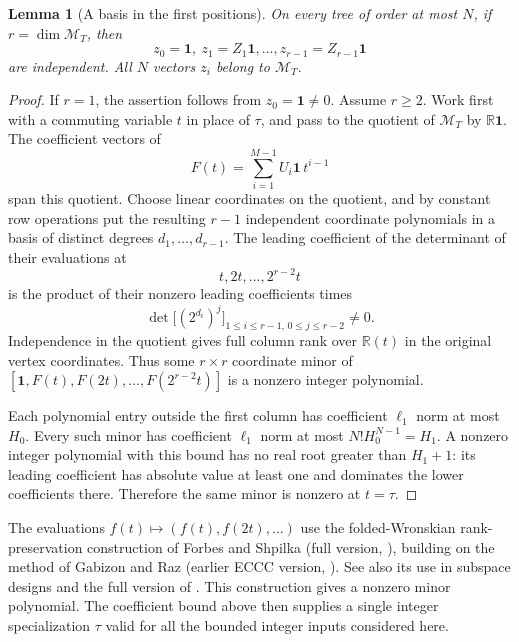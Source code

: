 \documentclass[11pt,letterpaper]{article}
\newtheorem{lemma}[theorem]{Lemma}
\theoremstyle{definition}\newtheorem{definition}[theorem]{Definition}
\theoremstyle{remark}\newtheorem{remark}[theorem]{Remark}
\newcommand{\R}{\mathbb R}\newcommand{\Q}{\mathbb Q}\newcommand{\Z}{\mathbb Z}
\newcommand{\one}{\mathbf1}\newcommand{\M}{\mathcal M}
\begin{document}
\begin{lemma}[A basis in the first positions]\label{lem:prefix}
On every tree of order at most $N$, if $r=\dim\M_T$, then
\[
z_0=\one,\ z_1=Z_1\one,\ldots,z_{r-1}=Z_{r-1}\one
\]
are independent. All $N$ vectors $z_i$ belong to $\M_T$.
\end{lemma}
\begin{proof}
If $r=1$, the assertion follows from $z_0=\one\ne0$. Assume $r\ge2$. Work first with a commuting variable $t$ in place of $\tau$, and pass to the quotient of $\M_T$ by $\R\one$. The coefficient vectors of
\[
F(t)=\sum_{i=1}^{M-1}U_i\one\,t^{i-1}
\]
span this quotient. Choose linear coordinates on the quotient, and by constant row operations put the resulting $r-1$ independent coordinate polynomials in a basis of distinct degrees $d_1,\ldots,d_{r-1}$. The leading coefficient of the determinant of their evaluations at
\[
t,2t,\ldots,2^{r-2}t
\]
is the product of their nonzero leading coefficients times
\[
\det\bigl[(2^{d_i})^j\bigr]_{1\le i\le r-1,\,0\le j\le r-2}\ne0.
\]
Independence in the quotient gives full column rank over $\R(t)$ in the original vertex coordinates. Thus some $r\times r$ coordinate minor of
$[\one,F(t),F(2t),\ldots,F(2^{r-2}t)]$ is a nonzero integer polynomial.

Each polynomial entry outside the first column has coefficient $\ell_1$ norm at most $H_0$. Every such minor has coefficient $\ell_1$ norm at most $N!H_0^{N-1}=H_1$. A nonzero integer polynomial with this bound has no real root greater than $H_1+1$: its leading coefficient has absolute value at least one and dominates the lower coefficients there. Therefore the same minor is nonzero at $t=\tau$.
\end{proof}

The evaluations $f(t)\mapsto(f(t),f(2t),\ldots)$ use the folded-Wronskian
rank-preservation construction of Forbes and Shpilka (full version,
\cite[Theorem 4.1 and Corollary 4.3]{FS12}), building on the method of Gabizon
and Raz (earlier ECCC version, \cite[Lemma 6.1]{GabizonRaz}). See also its use in subspace designs
\cite{GK} and the full version of \cite[Construction 2.7]{FG}.
This construction gives a nonzero minor
polynomial. The coefficient bound above then supplies a single integer
specialization $\tau$ valid for all the bounded integer inputs considered here.
\end{document}
